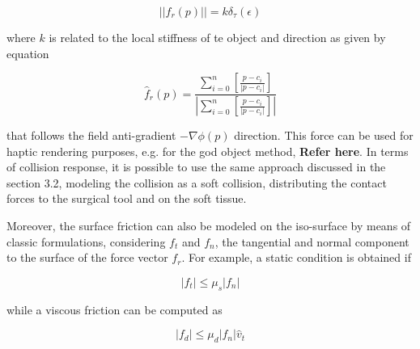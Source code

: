 \documentclass[journal]{vgtc}                %
\begin{document}
\begin{equation}
\left|| f_{r}(p) \right|| = k \delta _{\tau}(\epsilon)
\end{equation}
 
where $k$ is related to the local stiffness of te object and direction as given by equation 


\begin{equation}
\hat{f}_{r}(p) = \frac{\sum_{i=0}^{n} \left[\frac{p-c_{i}}{\left|p-c_{i}\right|}\right]}{\left| \sum_{i=0}^{n} \left[\frac{p-c_{i}}{\left| p-c_{i}\right|}\right]\right|}
\end{equation}

that follows the field anti-gradient $-\nabla \phi (p)$ direction. This force can be used for
haptic rendering purposes, e.g. for the god object method, \textbf{Refer here}. In terms of collision
response, it is possible to use the same approach discussed in the section 3.2,
modeling the collision as a soft collision, distributing the contact forces to the
surgical tool and on the soft tissue.

Moreover, the surface friction can also be modeled on the iso-surface by means of
classic formulations, considering $f_{t}$ and $f_{n}$, the tangential and normal component to
the surface of the force vector $f_{r}$. For example, a static condition is obtained if

\begin{equation}
\left|f_{t}\right| \le \mu _{s} \left|f_{n}\right|
\end{equation}

while a viscous friction can be computed as 

\begin{equation}
\left|f_{d}\right| \le \mu _{d} \left|f_{n}\right| \hat{v}_{t}
\end{equation}
\end{document}
